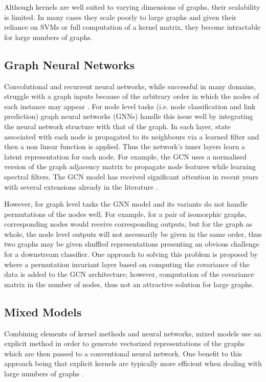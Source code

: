 \documentclass{article}
\theoremstyle{definition}
\begin{document}
Although kernels are well suited to varying dimensions of graphs, their scalability is limited. In many cases they scale poorly to large graphs \cite{Shervashidze2010} and given their reliance on SVMs or full computation of a kernel matrix, they become intractable for large numbers of graphs.

\subsection{Graph Neural Networks}

Convolutional and recurrent neural networks, while successful in many domains, struggle with a graph inputs because of the arbitrary order in which the nodes of each instance may appear \cite{Ying2018b}. For node level tasks (i.e. node classification and link prediction) graph neural networks (GNNs) \cite{Scarselli2009} handle this issue well by integrating the neural network structure with that of the graph. In each layer, state associated with each node is propagated to its neighbours via a learned filter and then a non linear function is applied. Thus the network's inner layers learn a latent representation for each node. For example, the GCN \cite{Kipf2016} uses a normalised version of the graph adjacency matrix to propagate node features while learning spectral filters. The GCN model has received significant attention in recent years with several extensions already in the literature \cite{Hamilton2017b,Atwood2016,Romero2018}.

However, for graph level tasks the GNN model and its variants do not handle permutations of the nodes well. For example, for a pair of isomorphic graphs, corresponding nodes would receive corresponding outputs, but for the graph as whole, the node level outputs will not necessarily be given in the same order, thus two graphs may be given shuffled representations presenting an obvious challenge for a downstream classifier. One approach to solving this problem is proposed by \cite{Verma2018} where a permutation invariant layer based on computing the covariance of the data is added to the GCN architecture; however, computation of the covariance matrix  in the number of nodes, thus not an attractive solution for large graphs.

\subsection{Mixed Models}

Combining elements of kernel methods and neural networks, mixed models use an explicit method in order to generate vectorized representations of the graphs which are then passed to a conventional neural network. One benefit to this approach being that explicit kernels are typically more efficient when dealing with large numbers of graphs \cite{Kriege2015}.
\end{document}
